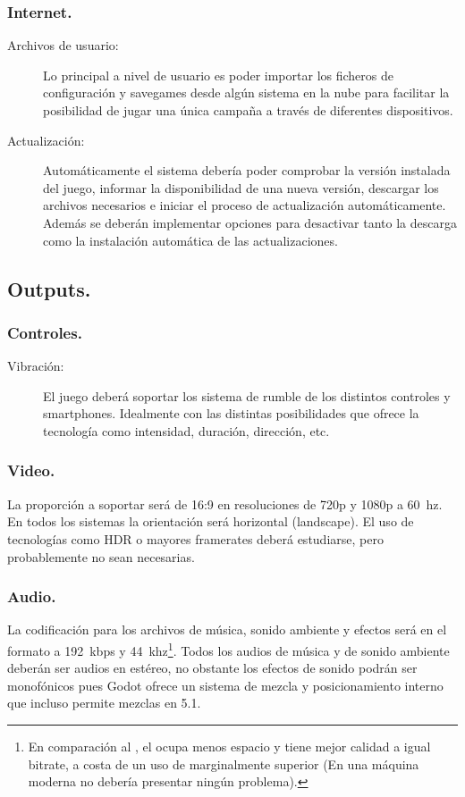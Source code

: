 \subsubsection{Internet.}
\begin{description}
\item[Archivos de usuario:] Lo principal a nivel de usuario es poder importar los ficheros de configuración y savegames desde algún sistema en la nube para facilitar la posibilidad de jugar una única campaña a través de diferentes dispositivos.

\item[Actualización:] Automáticamente el sistema debería poder comprobar la versión instalada del juego, informar la disponibilidad de una nueva versión, descargar los archivos necesarios e iniciar el proceso de actualización automáticamente. Además se deberán implementar opciones para desactivar tanto la descarga como la instalación automática de las actualizaciones.
\end{description}

\subsection{Outputs.}

\subsubsection{Controles.}
\begin{description}
\item[Vibración:] El juego deberá soportar los sistema de rumble de los distintos controles y smartphones. Idealmente con las distintas posibilidades que ofrece la tecnología como intensidad, duración, dirección, etc.
\end{description}

\subsubsection{Video.}
La proporción a soportar será de 16:9 en resoluciones de 720p y 1080p a 60~hz. En todos los sistemas la orientación será horizontal (landscape). El uso de tecnologías como HDR o mayores framerates deberá estudiarse, pero probablemente no sean necesarias.

\subsubsection{Audio.}
La codificación para los archivos de música, sonido ambiente y efectos será en el formato  a 192~kbps y 44~khz\footnote{En comparación al , el  ocupa menos espacio y tiene mejor calidad a igual bitrate, a costa de un uso de  marginalmente superior (En una máquina moderna no debería presentar ningún problema).}. Todos los audios de música y de sonido ambiente deberán ser audios en estéreo, no obstante los efectos de sonido podrán ser monofónicos pues Godot ofrece un sistema de mezcla y posicionamiento interno que incluso permite mezclas en 5.1.

